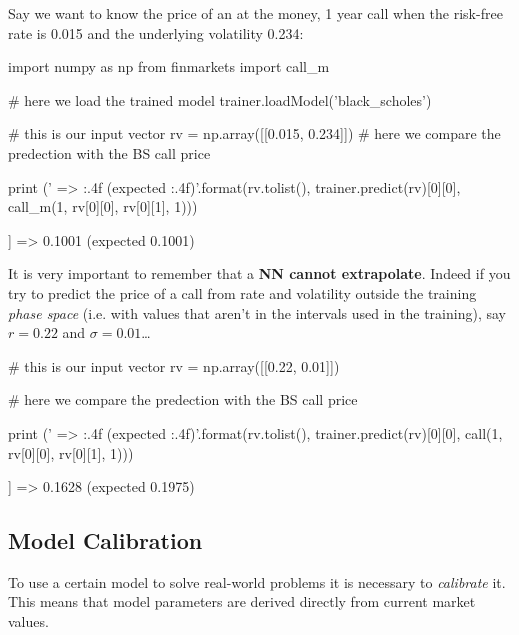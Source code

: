 Say we want to know the price of an at the money, 1 year call when the risk-free rate is 0.015 and the underlying volatility 0.234:

\begin{ipython}
import numpy as np
from finmarkets import call_m

# here we load the trained model
trainer.loadModel('black_scholes')

# this is our input vector
rv = np.array([[0.015, 0.234]])
# here we compare the predection with the BS call price

print ('{} => {:.4f} (expected {:.4f})'.format(rv.tolist(),
                                               trainer.predict(rv)[0][0],
                                               call_m(1, rv[0][0], rv[0][1], 1)))
\end{ipython}
\begin{ioutput}
[[0.015, 0.234]] => 0.1001 (expected 0.1001)
\end{ioutput}

It is very important to remember that a \textbf{NN cannot extrapolate}.
Indeed if you try to predict the price of a call from rate and volatility outside the training \emph{phase space} (i.e. with values that aren't in the intervals used in the training), say \(r = 0.22\) and \(\sigma = 0.01\)\ldots{}

\begin{ipython}
# this is our input vector
rv = np.array([[0.22, 0.01]])

# here we compare the predection with the BS call price

print ('{} => {:.4f} (expected {:.4f})'.format(rv.tolist(),
                                        trainer.predict(rv)[0][0],
                                        call(1, rv[0][0], rv[0][1], 1)))
\end{ipython}
\begin{ioutput}
[[0.22, 0.01]] => 0.1628 (expected 0.1975)
\end{ioutput}

\subsection{Model Calibration}\label{model-calibration}

To use a certain model to solve real-world problems it is necessary to \emph{calibrate} it. This means that model parameters are derived directly from current market values. 

